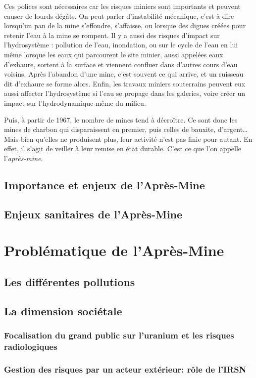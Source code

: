 \documentclass{article}
\begin{document}
Ces polices sont nécessaires car les risques miniers sont importants et peuvent causer de lourds dégâts. On peut parler d’instabilité mécanique, c’est à dire lorsqu’un pan de la mine s’effondre, s’affaisse, ou lorsque des digues créées pour retenir l’eau à la mine se rompent. Il y a aussi des risques d’impact sur l’hydrosystème : pollution de l’eau, inondation, ou sur le cycle de l’eau en lui même lorsque les eaux qui parcourent le site minier, aussi appelées eaux d’exhaure, sortent à la surface et viennent confluer dans d’autres cours d’eau voisins.
Après l’abandon d’une mine, c’est souvent ce qui arrive, et un ruisseau dit d’exhaure se forme alors. Enfin, les travaux miniers souterrains peuvent eux aussi affecter l’hydrosystème si l’eau se propage dans les galeries, voire créer un impact sur l’hydrodynamique même du milieu.

Puis, à partir de 1967, le nombre de mines tend à décroître. Ce sont donc les mines de charbon qui disparaissent en premier, puis celles de bauxite, d’argent… Mais bien qu’elles ne produisent plus, leur activité n’est pas finie pour autant. En effet, il s’agit de veiller à leur remise en état durable. C’est ce que l’on appelle l’\emph{après-mine}.

\subsection{Importance et enjeux de l’Après-Mine} 
\subsection{Enjeux sanitaires de l’Après-Mine}

\newpage
\section{Problématique de l’Après-Mine}
\subsection{Les différentes pollutions}
\subsection{La dimension sociétale}
\subsubsection{Focalisation du grand public sur l'uranium et les risques radiologiques}
\subsubsection{Gestion des risques par un acteur extérieur: rôle de l’IRSN}
\end{document}
